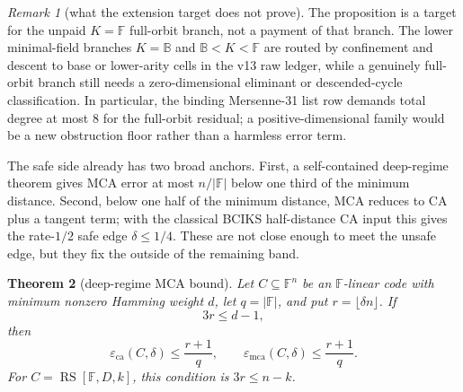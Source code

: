 \documentclass[a4paper,11pt]{amsart}
\newtheorem{theorem}{Theorem}[section]
\theoremstyle{remark}
\newtheorem{remark}[theorem]{Remark}
\newcommand{\F}{\mathbb F}
\newcommand{\B}{\mathbb B}
\newcommand{\RS}{\operatorname{RS}}
\newcommand{\emca}{\varepsilon_{\mathrm{mca}}}
\newcommand{\eca}{\varepsilon_{\mathrm{ca}}}
\begin{document}
\begin{remark}[what the extension target does not prove]\label{rem:extension-target-nonclaim}
The proposition is a target for the unpaid \(K=\F\) full-orbit branch, not a payment of that branch.  The lower minimal-field branches \(K=\B\) and \(\B<K<\F\) are routed by confinement and descent to base or lower-arity cells in the v13 raw ledger, while a genuinely full-orbit branch still needs a zero-dimensional eliminant or descended-cycle classification.  In particular, the binding Mersenne-31 list row demands total degree at most \(8\) for the full-orbit residual; a positive-dimensional family would be a new obstruction floor rather than a harmless error term.
\end{remark}

The safe side already has two broad anchors.  First, a self-contained deep-regime theorem gives MCA error at most \(n/|\F|\) below one third of the minimum distance.  Second, below one half of the minimum distance, MCA reduces to CA plus a tangent term; with the classical BCIKS half-distance CA input \cite{BCIKS20} this gives the rate-\(1/2\) safe edge \(\delta\le 1/4\).  These are not close enough to meet the unsafe edge, but they fix the outside of the remaining band.

\begin{theorem}[deep-regime MCA bound]\label{thm:gf-deep-mca}
Let \(C\subseteq\F^n\) be an \(\F\)-linear code with minimum nonzero Hamming weight \(d\), let \(q=|\F|\), and put \(r=\lfloor\delta n\rfloor\).  If
\[
        3r\le d-1,
\]
then
\[
        \eca(C,\delta)\le \frac{r+1}{q},
        \qquad
        \emca(C,\delta)\le \frac{r+1}{q}.
\]
For \(C=\RS[\F,D,k]\), this condition is \(3r\le n-k\).
\end{theorem}
\end{document}
